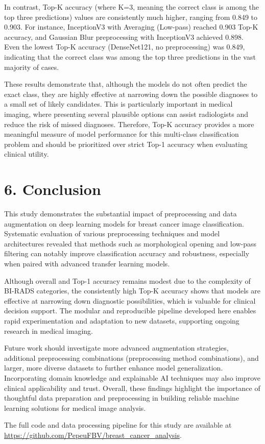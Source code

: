 \documentclass[12pt]{article}
\begin{document}
In contrast, Top-K accuracy (where K=3, meaning the correct class is among the top three predictions) values are consistently much higher, ranging from 0.849 to 0.903. For instance, InceptionV3 with Averaging (Low-pass) reached 0.903 Top-K accuracy, and Gaussian Blur preprocessing with InceptionV3 achieved 0.898. Even the lowest Top-K accuracy (DenseNet121, no preprocessing) was 0.849, indicating that the correct class was among the top three predictions in the vast majority of cases.

These results demonstrate that, although the models do not often predict the exact class, they are highly effective at narrowing down the possible diagnoses to a small set of likely candidates. This is particularly important in medical imaging, where presenting several plausible options can assist radiologists and reduce the risk of missed diagnoses. Therefore, Top-K accuracy provides a more meaningful measure of model performance for this multi-class classification problem and should be prioritized over strict Top-1 accuracy when evaluating clinical utility.

\section*{6. Conclusion}

This study demonstrates the substantial impact of preprocessing and data augmentation on deep learning models for breast cancer image classification. Systematic evaluation of various preprocessing techniques and model architectures revealed that methods such as morphological opening and low-pass filtering can notably improve classification accuracy and robustness, especially when paired with advanced transfer learning models.

Although overall and Top-1 accuracy remains modest due to the complexity of BI-RADS categories, the consistently high Top-K accuracy shows that models are effective at narrowing down diagnostic possibilities, which is valuable for clinical decision support. The modular and reproducible pipeline developed here enables rapid experimentation and adaptation to new datasets, supporting ongoing research in medical imaging.

Future work should investigate more advanced augmentation strategies, additional preprocessing combinations (preprocessing method combinations), and larger, more diverse datasets to further enhance model generalization. Incorporating domain knowledge and explainable AI techniques may also improve clinical applicability and trust. Overall, these findings highlight the importance of thoughtful data preparation and preprocessing in building reliable machine learning solutions for medical image analysis.


The full code and data processing pipeline for this study are available at \url{https://github.com/PepeuFBV/breast_cancer_analysis}.

\end{document}
